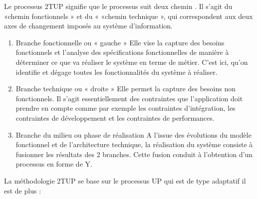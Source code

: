 \documentclass[11pt,a4paper,oneside]{book}
\begin{document}
	
	Le processus 2TUP signifie que le processus suit deux chemin . Il s’agit du «chemin fonctionnels » et du « «chemin technique », qui correspondent aux deux axes de changement imposés au système d’information.
	\begin{enumerate}
		\item Branche fonctionnelle ou « gauche »
		Elle vise la capture des besoins fonctionnels et l'analyse des spécifications fonctionnelles de manière à déterminer ce que va réaliser le système en terme de métier. C'est ici, qu'on identifie et dégage toutes les fonctionnalités du système à réaliser.
		\item Branche technique ou « droite »
		Elle permet la capture des besoins non fonctionnels. Il s'agit essentiellement des contraintes que l'application doit prendre en compte comme par exemple les contraintes d'intégration, les contraintes de développement et les contraintes de performances.
		\item Branche du milieu ou phase de réalisation 
		A l’issue des évolutions du modèle fonctionnel et de l’architecture technique, la réalisation du système consiste à fusionner les résultats des 2 branches. Cette fusion conduit à l’obtention d’un processus en forme de Y.
	\end{enumerate}
	La méthodologie 2TUP se base sur le processus UP qui est de type adaptatif il est de plus :
\end{document}
